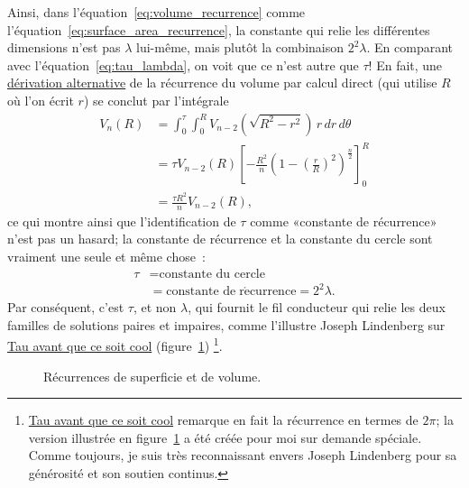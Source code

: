 Ainsi, dans l'équation~\eqref{eq:volume_recurrence} comme
l'équation~\eqref{eq:surface_area_recurrence}, la constante qui
relie les différentes dimensions n'est pas $\lambda$ lui-même, mais plutôt la
combinaison $2^2\lambda$. En comparant avec l'équation~\eqref{eq:tau_lambda}, on
voit que ce n'est autre que $\tau$\ns! En fait, une
\href{https://en.wikipedia.org/wiki/Volume_of_an_n-ball#The_two-dimension_recursion_formula}{dérivation
alternative} de la récurrence du volume par calcul direct (qui utilise $R$ où
l'on écrit $r$) se conclut par l'intégrale
\begin{equation}
\label{eq:integral_recurrence}
\begin{split}
V_n(R) & = \int_0^\tau \int_0^R V_{n-2}\left(\sqrt{R^2 - r^2}\right) \,r\,dr\,d\theta \\
       & = \tau V_{n-2}(R) \left[-\frac{R^2}{n}\left(1 - \left(\frac{r}{R}\right)^2\right)^\frac{n}{2}\right]_{0}^{R} \\
       & = \frac{\tau R^2}{n} V_{n-2}(R),
\end{split}
\end{equation}
ce qui montre ainsi que l'identification de $\tau$ comme «\ns constante de
récurrence\ns » n'est pas un hasard\ns; la constante de récurrence et la constante
du cercle sont vraiment une seule et même chose~:
\[
\begin{split}
\tau & = \mbox{constante du cercle} \\
     & = \mbox{constante de}\; \mathrm{r\acute{e}currence} = 2^2\lambda.
\end{split}
\]
Par conséquent, c'est $\tau$, et non $\lambda$, qui fournit le fil conducteur
qui relie les deux familles de solutions paires et impaires, comme l'illustre
Joseph Lindenberg sur
\href{https://translate.google.com/translate?hl=en&sl=en&tl=fr&u=https://sites.google.com/site/taubeforeitwascool/}{Tau
avant que ce soit cool}
(figure~\ref{fig:Nspheres})\ns
\footnote{\href{https://translate.google.com/translate?hl=en&sl=en&tl=fr&u=https://sites.google.com/site/taubeforeitwascool/}{Tau
avant que ce soit cool} remarque en fait la récurrence en termes de $2\pi$\ns; la
version illustrée en figure~\ref{fig:Nspheres} a été créée pour moi sur
demande spéciale. Comme toujours, je suis très reconnaissant envers Joseph Lindenberg
pour sa générosité et son soutien continus.}.

\begin{figure}
\begin{center}
\end{center}
\caption{Récurrences de superficie et de volume.\label{fig:Nspheres}}
\end{figure}

